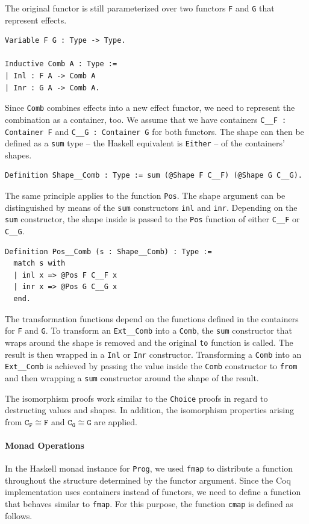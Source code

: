 \documentclass[a4paper, 11pt, fleqn, twoside]{scrreprt}
\newcommand{\hinl}[1]{\texttt{#1}}
\newcommand{\cinl}[1]{\texttt{#1}}
\begin{document}
The original functor is still parameterized over two functors \cinl{F} and \cinl{G} that represent effects.

\begin{verbatim}
Variable F G : Type -> Type.

Inductive Comb A : Type :=
| Inl : F A -> Comb A
| Inr : G A -> Comb A.
\end{verbatim}

Since \cinl{Comb} combines effects into a new effect functor, we need to represent the combination as a container, too.
We assume that we have containers \cinl{C__F : Container F} and \cinl{C__G : Container G} for both functors.
The shape can then be defined as a \cinl{sum} type -- the Haskell equivalent is \hinl{Either} -- of the containers' shapes.

\begin{verbatim}
Definition Shape__Comb : Type := sum (@Shape F C__F) (@Shape G C__G).
\end{verbatim}

The same principle applies to the function \cinl{Pos}.
The shape argument can be distinguished by means of the \cinl{sum} constructors \cinl{inl} and \cinl{inr}.
Depending on the \cinl{sum} constructor, the shape inside is passed to the \cinl{Pos} function of either \cinl{C__F} or \cinl{C__G}.

\begin{verbatim}
Definition Pos__Comb (s : Shape__Comb) : Type :=
  match s with
  | inl x => @Pos F C__F x
  | inr x => @Pos G C__G x
  end.
\end{verbatim}

The transformation functions depend on the functions defined in the containers for \cinl{F} and \cinl{G}.
To transform an \cinl{Ext__Comb} into a \cinl{Comb}, the \cinl{sum} constructor that wraps around the shape is removed and the original \cinl{to} function is called.
The result is then wrapped in a \cinl{Inl} or \cinl{Inr} constructor.
Transforming a \cinl{Comb} into an \cinl{Ext__Comb} is achieved by passing the value inside the \hinl{Comb} constructor to \cinl{from} and then wrapping a \cinl{sum} constructor around the shape of the result.

The isomorphism proofs work similar to the \cinl{Choice} proofs in regard to destructing values and shapes.
In addition, the isomorphism properties arising from $\texttt{C}_\texttt{F} \cong \texttt{F}$ and $\texttt{C}_\texttt{G} \cong \texttt{G}$ are applied.

\paragraph{Monad Operations}
In the Haskell monad instance for \hinl{Prog}, we used \hinl{fmap} to distribute a function throughout the structure determined by the functor argument.
Since the Coq implementation uses containers instead of functors, we need to define a function that behaves similar to \hinl{fmap}.
For this purpose, the function \cinl{cmap} is defined as follows.
\end{document}
